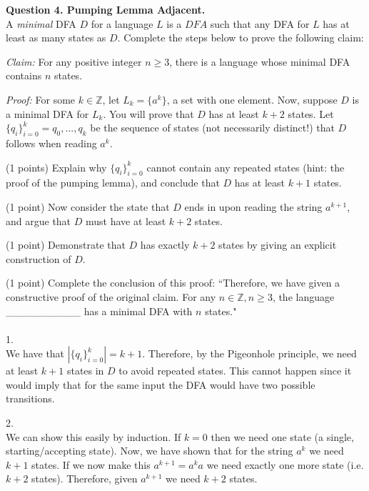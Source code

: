 \documentclass{article}
\newenvironment{question}[2]
{
    {\large \textbf{Question #1.}}\\
    #2\\\\
}{\newpage}
\begin{document}
\begin{question}
    {4. Pumping Lemma Adjacent}
    {A \emph{minimal} DFA $D$ for a language $L$ is a $DFA$ such that any DFA for
        $L$ has at least as many states as $D$.  Complete the steps below to prove the
        following claim:

        \emph{Claim:} For any positive integer $n \geq 3$, there is a language whose
        minimal DFA contains $n$ states.

        \emph{Proof:} For some $k \in \mathbb{Z}$, let $L_k = \{a^k\}$, a set with one
        element. Now, suppose $D$ is a minimal DFA for $L_k$. You will prove that $D$ has
        at least $k+2$ states.  Let $\{q_i\}_{i=0}^k = q_0, ..., q_k$ be the sequence of
        states (not necessarily distinct!) that $D$ follows when reading $a^k$.

        (1 points) Explain why $\{q_i\}_{i=0}^k$ cannot contain any repeated states
        (hint: the proof of the pumping lemma), and conclude that $D$ has at least $k+1$
        states.

        (1 point) Now consider the state that $D$ ends in upon reading the string
        $a^{k+1}$, and argue that $D$ must have at least $k+2$ states.

        (1 point) Demonstrate that $D$ has exactly $k+2$ states by giving an explicit
        construction of $D$.

        (1 point) Complete the conclusion of this proof: ``Therefore, we have given a
        constructive proof of the original claim. For any $n \in \mathbb{Z}, n \geq 3$, the
        language \_\_\_\_\_\_\_\_\_\_ has a minimal DFA with $n$ states."}

    1.\\
    We have that $|\{q_i\}_{i=0}^k| = k + 1$. Therefore, by the Pigeonhole principle,
    we need at least $k + 1$ states in $D$ to avoid repeated states. This cannot happen
    since it would imply that for the same input the DFA would have two possible
    transitions.

    2.\\
    We can show this easily by induction. If $k = 0$ then we need one state
    (a single, starting/accepting state). Now, we have shown that for the string
    $a^k$ we need $k + 1$ states. If we now make this $a^{k + 1} = a^ka$ we
    need exactly one more state (i.e. $k + 2$ states). Therefore,
    given $a^{k+1}$ we need $k + 2$ states.


\end{question}
\end{document}
